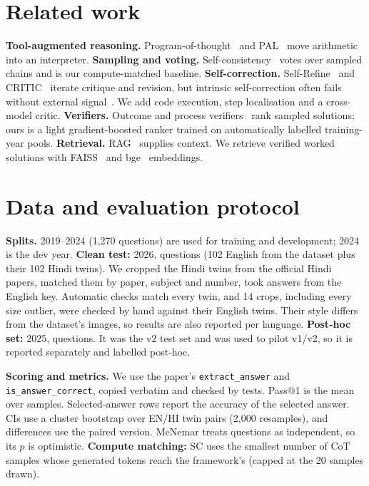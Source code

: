 \documentclass[conference]{IEEEtran}
\begin{document}
\section{Related work}
\textbf{Tool-augmented reasoning.} Program-of-thought~\cite{pot} and PAL~\cite{pal} move
arithmetic into an interpreter.
\textbf{Sampling and voting.} Self-consistency~\cite{selfconsistency} votes over sampled chains
and is our compute-matched baseline.
\textbf{Self-correction.} Self-Refine~\cite{selfrefine} and CRITIC~\cite{critic} iterate critique
and revision, but intrinsic self-correction often fails without external
signal~\cite{cannotselfcorrect}. We add code execution, step localisation and a cross-model critic.
\textbf{Verifiers.} Outcome and process verifiers~\cite{cobbe,lightman} rank sampled solutions;
ours is a light gradient-boosted ranker trained on automatically labelled training-year pools.
\textbf{Retrieval.} RAG~\cite{rag} supplies context. We retrieve verified worked solutions with
FAISS~\cite{faiss} and bge~\cite{bge} embeddings.

\section{Data and evaluation protocol}
\textbf{Splits.} 2019--2024 (1{,}270 questions) are used for training and development; 2024 is the
dev year.
\textbf{Clean test:} 2026, \NTest{} questions (102 English from the dataset plus their 102 Hindi
twins). We cropped the Hindi twins from the official Hindi papers, matched them by paper, subject
and number, took answers from the English key. Automatic checks match every twin, and 14 crops,
including every size outlier, were checked by hand against their English twins. Their style
differs from the dataset's images, so results are also reported per language.
\textbf{Post-hoc set:} 2025, \NPost{} questions. It was the v2 test set and was used to pilot
v1/v2, so it is reported separately and labelled post-hoc.

\textbf{Scoring and metrics.} We use the paper's \texttt{extract\_answer} and
\texttt{is\_answer\_correct}, copied verbatim and checked by tests. Pass@1 is the mean over samples.
Selected-answer rows report the accuracy of the selected answer. CIs use a cluster bootstrap over
EN/HI twin pairs (2{,}000 resamples), and differences use the paired version. McNemar treats
questions as independent, so its $p$ is optimistic.
\textbf{Compute matching:} SC uses the smallest number of CoT samples whose generated tokens reach
the framework's (capped at the 20 samples drawn).
\end{document}
